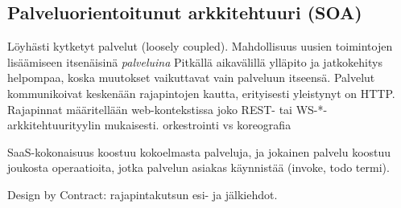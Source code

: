 \documentclass[finnish,gradu]{tktltiki}
\begin{document}


  \subsection{Palveluorientoitunut arkkitehtuuri (SOA)} %
  \label{sub:arkkitehtuurityyli_soa}

  Löyhästi kytketyt palvelut (loosely coupled).
  Mahdollisuus uusien toimintojen lisäämiseen itsenäisinä \emph{palveluina}
  Pitkällä aikavälillä ylläpito ja jatkokehitys helpompaa, koska muutokset vaikuttavat vain palveluun itseensä.
  Palvelut kommunikoivat keskenään rajapintojen kautta, erityisesti yleistynyt on HTTP.
  Rajapinnat määritellään web-kontekstissa joko REST- tai WS-*-arkkitehtuurityylin mukaisesti.
  orkestrointi vs koreografia

  SaaS-kokonaisuus koostuu kokoelmasta palveluja, ja jokainen palvelu koostuu joukosta operaatioita, jotka palvelun asiakas käynnistää (invoke, todo termi).

  Design by Contract: rajapintakutsun esi- ja jälkiehdot.



\end{document}
